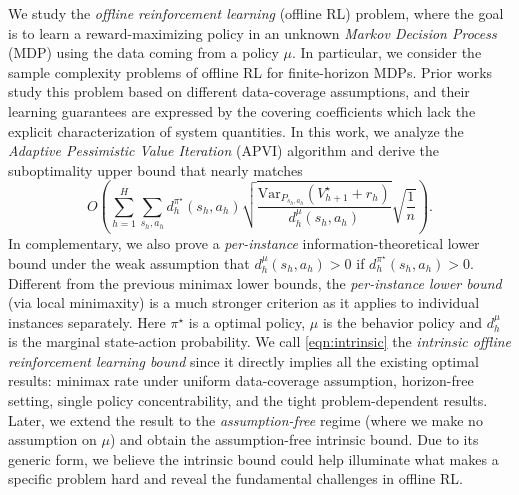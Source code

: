 
We study the \emph{offline reinforcement learning}  (offline RL) problem, where the goal is to learn a reward-maximizing policy in an unknown \emph{Markov Decision Process} (MDP) using the data coming from a policy $\mu$. In particular, we consider the sample complexity problems of offline RL for finite-horizon MDPs. Prior works study this problem based on different data-coverage assumptions, and their learning guarantees are expressed by the covering coefficients which lack the explicit characterization of system quantities. In this work, we analyze the \emph{Adaptive Pessimistic Value Iteration} (APVI) algorithm and derive the suboptimality upper bound that nearly matches
\begin{equation}\label{eqn:intrinsic}
O\left(\sum_{h=1}^H\sum_{s_h,a_h}d^{\pi^\star}_h(s_h,a_h)\sqrt{\frac{\mathrm{Var}_{P_{s_h,a_h}}{(V^\star_{h+1}+r_h)}}{d^\mu_h(s_h,a_h)}}\sqrt{\frac{1}{n}}\right).
\end{equation}
In complementary, we also prove a \emph{per-instance} information-theoretical lower bound under the weak assumption that $d^\mu_h(s_h,a_h)>0$ if $d^{\pi^\star}_h(s_h,a_h)>0$. Different from the previous minimax lower bounds, the \emph{per-instance lower bound} (via local minimaxity) is a much stronger criterion as it applies to individual instances separately. Here $\pi^\star$ is a optimal policy, $\mu$ is the behavior policy and $d_h^\mu$ is the marginal state-action probability. We call \eqref{eqn:intrinsic} the \emph{intrinsic offline reinforcement learning bound} since it directly implies all the existing optimal results: minimax rate under uniform data-coverage assumption, horizon-free setting, single policy concentrability, and the tight problem-dependent results. Later, we extend the result to the \emph{assumption-free} regime (where we make no assumption on $
\mu$) and obtain the assumption-free intrinsic bound. Due to its generic form, we believe the intrinsic bound could help illuminate what makes a specific problem hard and reveal the fundamental challenges in offline RL.






 